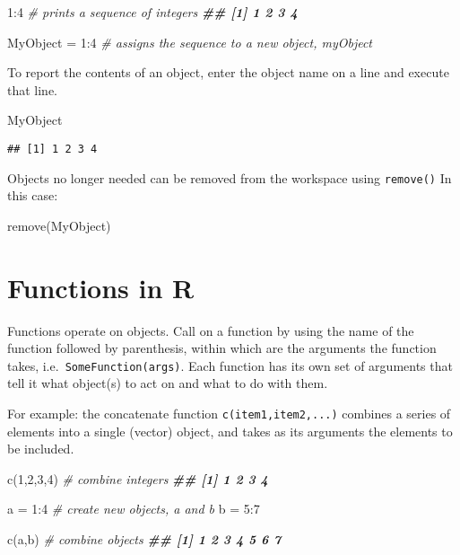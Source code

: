 \documentclass[
  12pt,
]{krantz}
\newenvironment{Shaded}{\begin{snugshade}}{\end{snugshade}}
\newcommand{\CommentTok}[1]{\textcolor[rgb]{0.56,0.35,0.01}{\textit{#1}}}
\newcommand{\DecValTok}[1]{\textcolor[rgb]{0.00,0.00,0.81}{#1}}
\newcommand{\DocumentationTok}[1]{\textcolor[rgb]{0.56,0.35,0.01}{\textbf{\textit{#1}}}}
\newcommand{\FunctionTok}[1]{\textcolor[rgb]{0.00,0.00,0.00}{#1}}
\newcommand{\NormalTok}[1]{#1}
\newcommand{\OtherTok}[1]{\textcolor[rgb]{0.56,0.35,0.01}{#1}}
\newcommand{\SpecialCharTok}[1]{\textcolor[rgb]{0.00,0.00,0.00}{#1}}
\begin{document}
\begin{Shaded}
\begin{Highlighting}[]
  \DecValTok{1}\SpecialCharTok{:}\DecValTok{4}               \CommentTok{\# prints a sequence of integers}
\DocumentationTok{\#\# [1] 1 2 3 4}
     
\NormalTok{  MyObject }\OtherTok{=} \DecValTok{1}\SpecialCharTok{:}\DecValTok{4}    \CommentTok{\# assigns the sequence to a new object, myObject}
\end{Highlighting}
\end{Shaded}

To report the contents of an object, enter the object name on a line and execute that line.

\begin{Shaded}
\begin{Highlighting}[]
\NormalTok{  MyObject}
\end{Highlighting}
\end{Shaded}

\begin{verbatim}
## [1] 1 2 3 4
\end{verbatim}

Objects no longer needed can be removed from the workspace using \texttt{remove()} In this case:

\begin{Shaded}
\begin{Highlighting}[]
  \FunctionTok{remove}\NormalTok{(MyObject)}
\end{Highlighting}
\end{Shaded}

\hypertarget{functions-in-r}{%
\section{Functions in R}\label{functions-in-r}}

Functions operate on objects. Call on a function by using the name of the function followed by parenthesis, within which are the arguments the function takes, i.e.~\texttt{SomeFunction(args)}. Each function has its own set of arguments that tell it what object(s) to act on and what to do with them.

For example: the concatenate function \texttt{c(item1,item2,...)} combines a series of elements into a single (vector) object, and takes as its arguments the elements to be included.

\begin{Shaded}
\begin{Highlighting}[]
  \FunctionTok{c}\NormalTok{(}\DecValTok{1}\NormalTok{,}\DecValTok{2}\NormalTok{,}\DecValTok{3}\NormalTok{,}\DecValTok{4}\NormalTok{)   }\CommentTok{\# combine integers}
\DocumentationTok{\#\# [1] 1 2 3 4}

\NormalTok{  a }\OtherTok{=} \DecValTok{1}\SpecialCharTok{:}\DecValTok{4}        \CommentTok{\# create new objects, a and b         }
\NormalTok{  b }\OtherTok{=} \DecValTok{5}\SpecialCharTok{:}\DecValTok{7}
  
  \FunctionTok{c}\NormalTok{(a,b)         }\CommentTok{\# combine objects}
\DocumentationTok{\#\# [1] 1 2 3 4 5 6 7}
\end{Highlighting}
\end{Shaded}
\end{document}
